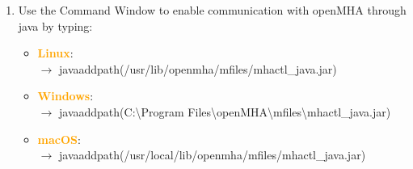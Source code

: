 \documentclass[11pt,a4paper,twoside]{article}
\newcommand{\+}{\discretionary{\mbox{\scriptsize$\hookleftarrow$}}{}{}}
\begin{document}
{{\begin{enumerate}
\item Use the Command Window to enable communication with openMHA through java by typing: 

\begin{itemize}
\item \textcolor{orange}{\textbf{Linux}}: \\ $\rightarrow$
  {\ttfamily javaaddpath(\textquotesingle{}/usr/lib/openmha/mfiles/mhactl\_java.jar\textquotesingle{})}
\item \textcolor{orange}{\textbf{Windows}}: \\ $\rightarrow$
  {\ttfamily javaaddpath(\textquotesingle{}C:\textbackslash Program Files\textbackslash openMHA\textbackslash mfiles\textbackslash mhactl\_java.jar\textquotesingle{})}
\item \textcolor{orange}{\textbf{macOS}}: \\ $\rightarrow$
  {\ttfamily javaaddpath(\textquotesingle{}/usr/local/lib/openmha/mfiles/mhactl\_java.jar\textquotesingle{})}
\end{itemize}


\end{enumerate}}}
\end{document}
